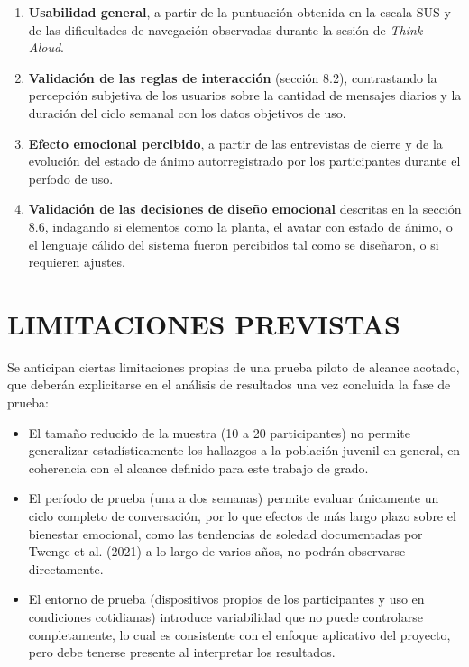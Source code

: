 \begin{enumerate}
    \item \textbf{Usabilidad general}, a partir de la puntuación obtenida en la escala SUS y de las dificultades de navegación observadas durante la sesión de \textit{Think Aloud}.
    \item \textbf{Validación de las reglas de interacción} (sección 8.2), contrastando la percepción subjetiva de los usuarios sobre la cantidad de mensajes diarios y la duración del ciclo semanal con los datos objetivos de uso.
    \item \textbf{Efecto emocional percibido}, a partir de las entrevistas de cierre y de la evolución del estado de ánimo autorregistrado por los participantes durante el período de uso.
    \item \textbf{Validación de las decisiones de diseño emocional} descritas en la sección 8.6, indagando si elementos como la planta, el avatar con estado de ánimo, o el lenguaje cálido del sistema fueron percibidos tal como se diseñaron, o si requieren ajustes.
\end{enumerate}

\section{LIMITACIONES PREVISTAS}
Se anticipan ciertas limitaciones propias de una prueba piloto de alcance acotado, que deberán explicitarse en el análisis de resultados una vez concluida la fase de prueba:

\begin{itemize}
    \item El tamaño reducido de la muestra (10 a 20 participantes) no permite generalizar estadísticamente los hallazgos a la población juvenil en general, en coherencia con el alcance definido para este trabajo de grado.
    \item El período de prueba (una a dos semanas) permite evaluar únicamente un ciclo completo de conversación, por lo que efectos de más largo plazo sobre el bienestar emocional, como las tendencias de soledad documentadas por Twenge et al. (2021) a lo largo de varios años, no podrán observarse directamente.
    \item El entorno de prueba (dispositivos propios de los participantes y uso en condiciones cotidianas) introduce variabilidad que no puede controlarse completamente, lo cual es consistente con el enfoque aplicativo del proyecto, pero debe tenerse presente al interpretar los resultados.
\end{itemize}

